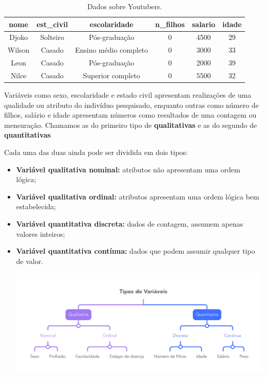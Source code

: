 \documentclass[
]{book}
\begin{document}
\begin{table}

\caption{\label{tab:youtubers}Dados sobre Youtubers.}
\centering
\begin{tabular}[t]{c|c|c|c|c|c}
\hline
nome & est\_civil & escolaridade & n\_filhos & salario & idade\\
\hline
Djoko & Solteiro & Pós-graduação & 0 & 4500 & 29\\
\hline
Wilson & Casado & Ensino médio completo & 0 & 3000 & 33\\
\hline
Leon & Casado & Pós-graduação & 0 & 2000 & 39\\
\hline
Nilce & Casado & Superior completo & 0 & 5500 & 32\\
\hline
\end{tabular}
\end{table}

Variáveis como sexo, escolaridade e estado civil apresentam realizações de uma qualidade ou atributo do indivíduo pesquisado, enquanto outras como número de filhos, salário e idade apresentam números como resultados de uma contagem ou mensuração. Chamamos as do primeiro tipo de \textbf{qualitativas} e as do segundo de \textbf{quantitativas}

Cada uma das duas ainda pode ser dividida em dois tipos:

\begin{itemize}
\item
  \textbf{Variável qualitativa nominal:} atributos não apresentam uma ordem lógica;
\item
  \textbf{Variável qualitativa ordinal:} atributos apresentam uma ordem lógica bem estabelecida;
\item
  \textbf{Variável quantitativa discreta:} dados de contagem, assumem apenas valores inteiros;
\item
  \textbf{Variável quantitativa contínua:} dados que podem assumir qualquer tipo de valor.

  \includegraphics{figs/tipos_de_variaveis.png}
\end{itemize}
\end{document}
